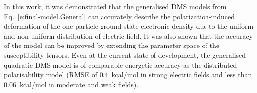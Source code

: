 \documentclass[aip,amsmath,amssymb,reprint,floatfix]{revtex4-1}
\begin{document}
%
In this work, it was demonstrated that the generalised DMS models from Eq.~\eqref{e:final-model.General}
can accurately describe the polarization\hyp{}induced deformation of the one\hyp{}particle ground\hyp{}state electronic density
due to the uniform and non\hyp{}uniform distribution of electric field.
It was also shown that the accuracy of the model can be improved by extending the parameter space of the susceptibility tensors.
Even at the current state of development, the generalised quadratic DMS model
is of comparable energetic accuracy as the distributed polarisability model (RMSE of 0.4~kcal/mol in strong 
electric fields and less than 0.06~kcal/mol in moderate and weak fields).
\end{document}

